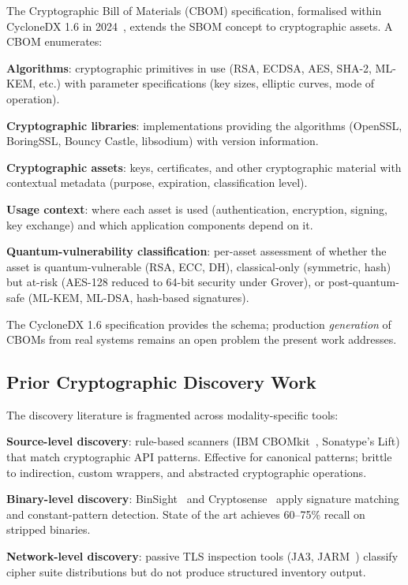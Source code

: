 \documentclass[sigconf,nonacm]{acmart}
\begin{document}
The Cryptographic Bill of Materials (CBOM) specification, formalised
within CycloneDX 1.6 in 2024~\cite{cyclonedx2024crypto}, extends the
SBOM concept to cryptographic assets. A CBOM enumerates:

\textbf{Algorithms}: cryptographic primitives in use (RSA, ECDSA,
AES, SHA-2, ML-KEM, etc.) with parameter specifications (key sizes,
elliptic curves, mode of operation).

\textbf{Cryptographic libraries}: implementations providing the
algorithms (OpenSSL, BoringSSL, Bouncy Castle, libsodium) with
version information.

\textbf{Cryptographic assets}: keys, certificates, and other
cryptographic material with contextual metadata (purpose, expiration,
classification level).

\textbf{Usage context}: where each asset is used (authentication,
encryption, signing, key exchange) and which application components
depend on it.

\textbf{Quantum-vulnerability classification}: per-asset assessment of
whether the asset is quantum-vulnerable (RSA, ECC, DH), classical-only
(symmetric, hash) but at-risk (AES-128 reduced to 64-bit security under
Grover), or post-quantum-safe (ML-KEM, ML-DSA, hash-based signatures).

The CycloneDX 1.6 specification provides the schema; production
\emph{generation} of CBOMs from real systems remains an open problem
the present work addresses.

\subsection{Prior Cryptographic Discovery Work}

The discovery literature is fragmented across modality-specific tools:

\textbf{Source-level discovery}: rule-based scanners
(IBM CBOMkit~\cite{ibm2024cbomkit}, Sonatype's Lift) that match
cryptographic API patterns. Effective for canonical patterns; brittle
to indirection, custom wrappers, and abstracted cryptographic
operations.

\textbf{Binary-level discovery}: BinSight~\cite{caballero2023binsight}
and Cryptosense~\cite{cryptosense2024} apply signature matching and
constant-pattern detection. State of the art achieves 60--75\% recall
on stripped binaries.

\textbf{Network-level discovery}: passive TLS inspection tools
(JA3, JARM~\cite{salesforce2024jarm}) classify cipher suite
distributions but do not produce structured inventory output.
\end{document}
